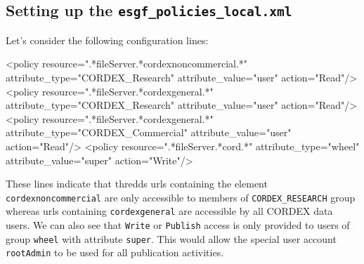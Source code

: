 \subsection{Setting up the \texttt{esgf\_policies\_local.xml}}
Let's consider the following configuration lines:
\begin{tiny}
\begin{verbatimtab}[4]
<policy resource=".*fileServer.*cordexnoncommercial.*" attribute_type="CORDEX_Research" attribute_value="user" action="Read"/>
<policy resource=".*fileServer.*cordexgeneral.*" attribute_type="CORDEX_Research" attribute_value="user" action="Read"/>
<policy resource=".*fileServer.*cordexgeneral.*" attribute_type="CORDEX_Commercial" attribute_value="user" action="Read"/>
<policy resource=".*fileServer.*cord.*" attribute_type="wheel" attribute_value="super" action="Write"/>
\end{verbatimtab}
\end{tiny}
These lines indicate that thredds urls containing the element \texttt{cordexnoncommercial} are only accessible to members of \texttt{CORDEX\_RESEARCH} group whereas urls containing \texttt{cordexgeneral} are accessible by all CORDEX data users. We can also see that \texttt{Write} or \texttt{Publish} access is only provided to users of group \texttt{wheel} with attribute \texttt{super}. This would allow the special user account \texttt{rootAdmin} to be used for all publication activities.
